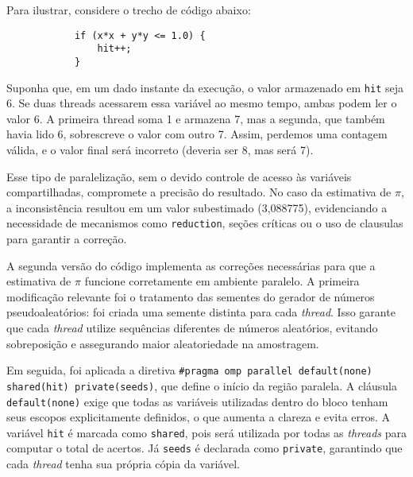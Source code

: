 \documentclass[a4paper, 12pt]{article}
\begin{document}
	\hspace{0.7cm}Para ilustrar, considere o trecho de código abaixo:
	
	\begin{center}
		\lstset{basicstyle=\ttfamily}
		\begin{lstlisting}
			if (x*x + y*y <= 1.0) {
				hit++;
			}
		\end{lstlisting}
	\end{center}
	
	\hspace{0.5cm}Suponha que, em um dado instante da execução, o valor armazenado em \texttt{hit} seja 6. Se duas threads acessarem essa variável ao mesmo tempo, ambas podem ler o valor 6. A primeira thread soma 1 e armazena 7, mas a segunda, que também havia lido 6, sobrescreve o valor com outro 7. Assim, perdemos uma contagem válida, e o valor final será incorreto (deveria ser 8, mas será 7).
	
	\hspace{0.5cm}Esse tipo de paralelização, sem o devido controle de acesso às variáveis compartilhadas, compromete a precisão do resultado. No caso da estimativa de $\pi$, a inconsistência resultou em um valor subestimado (3{,}088775), evidenciando a necessidade de mecanismos como \texttt{reduction}, seções críticas ou o uso de clausulas para garantir a correção.
	
	\hspace{0.5cm}A segunda versão do código implementa as correções necessárias para que a estimativa de $\pi$ funcione corretamente em ambiente paralelo. A primeira modificação relevante foi o tratamento das sementes do gerador de números pseudoaleatórios: foi criada uma semente distinta para cada \textit{thread}. Isso garante que cada \textit{thread} utilize sequências diferentes de números aleatórios, evitando sobreposição e assegurando maior aleatoriedade na amostragem.
	
	\hspace{0.5cm}Em seguida, foi aplicada a diretiva \texttt{\#pragma omp parallel default(none) shared(hit) private(seeds)}, que define o início da região paralela. A cláusula \texttt{default(none)} exige que todas as variáveis utilizadas dentro do bloco tenham seus escopos explicitamente definidos, o que aumenta a clareza e evita erros. A variável \texttt{hit} é marcada como \texttt{shared}, pois será utilizada por todas as \textit{threads} para computar o total de acertos. Já \texttt{seeds} é declarada como \texttt{private}, garantindo que cada \textit{thread} tenha sua própria cópia da variável.
	
\end{document}

